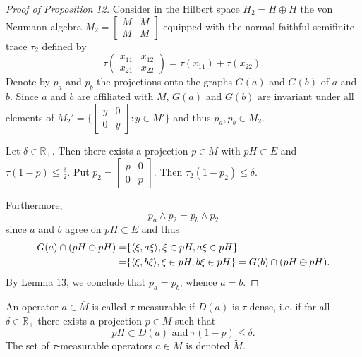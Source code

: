 \begin{proof}[Proof of Proposition 12]
    Consider in the Hilbert space $H_2=H\oplus H$ the von Neumann algebra $M_2=\begin{bmatrix}
            M & M \\
            M & M
        \end{bmatrix}$ equipped with the normal faithful semifinite trace $\tau_2$ defined by
    \[
        \tau \begin{pmatrix}
            x_{11} & x_{12} \\
            x_{21} & x_{22}
        \end{pmatrix}=\tau(x_{11})+\tau(x_{22}).
    \]
    Denote by $p_a$ and $p_b$ the projections onto the graphs $G(a)$ and $G(b)$ of $a$ and $b$. Since $a$ and $b$ are affiliated with $M$, $G(a)$ and $G(b)$ are invariant under all elements of $M_2'=\{\begin{bmatrix}
            y & 0 \\
            0 & y
        \end{bmatrix}:y\in M'\}$ and thus $p_a,p_b\in M_2$. \par
    Let $\delta\in \mathbb{R}_+$. Then there exists a projection $p\in M$ with
    $pH\subset E$ and $\tau(1-p)\leq \frac{\delta}{2}$. Put $p_2= \begin{bmatrix}
            p & 0 \\
            0 & p
        \end{bmatrix}$. Then $\tau_2(1-p_2)\leq \delta$.\par
    Furthermore,
    \[
        p_a\wedge p_2=p_b\wedge p_2
    \]
    since $a$ and $b$ agree on $pH\subset E$ and thus
    \[
        \begin{split}
            G(a)\cap(pH\oplus pH) =& \{\langle\xi,a\xi\rangle,\xi\in pH, a\xi\in pH\}\\
            =& \{\langle\xi,b\xi\rangle,\xi\in pH, b\xi\in pH\}=G(b)\cap(pH\oplus pH).
        \end{split}
    \]
    By Lemma 13, we conclude that $p_a=p_b$, whence $a = b$.
\end{proof}
\begin{definition}\label{def: 14}
    An operator $a\in \overline{M}$ is called $\tau$-measurable if $D(a)$ is $\tau$-dense, i.e. if for all $\delta\in \mathbb{R}_+$ there exists a projection $p\in M$ such that
    \begin{equation}
        pH\subset D(a) \text{ and } \tau(1-p)\leq \delta.
    \end{equation}
    The set of $\tau$-measurable operators $a\in \overline{M}$ is denoted $\widetilde{M}$.
\end{definition}
